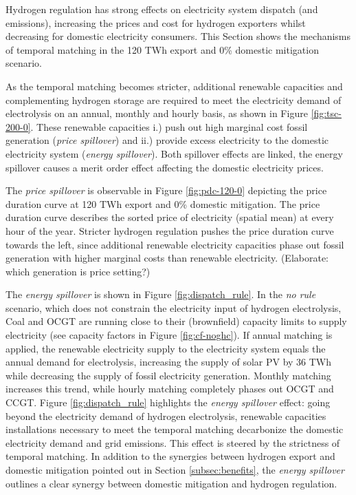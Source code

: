 Hydrogen regulation has strong effects on electricity system dispatch (and emissions), increasing the prices and cost for hydrogen exporters whilst decreasing for domestic electricity consumers. This Section shows the mechanisms of temporal matching in the 120 TWh export and 0\% domestic mitigation scenario.

As the temporal matching becomes stricter, additional renewable capacities and complementing hydrogen storage are required to meet the electricity demand of electrolysis on an annual, monthly and hourly basis, as shown in Figure \ref{fig:tsc-200-0}. These renewable capacities i.) push out high marginal cost fossil generation (\textit{price spillover}) and ii.) provide excess electricity to the domestic electricity system (\textit{energy spillover}). Both spillover effects are linked, the energy spillover causes a merit order effect affecting the domestic electricity prices.

The \textit{price spillover} is observable in Figure \ref{fig:pdc-120-0} depicting the price duration curve at 120 TWh export and 0\% domestic mitigation. The price duration curve describes the sorted price of electricity (spatial mean) at every hour of the year.
Stricter hydrogen regulation pushes the price duration curve towards the left, since additional renewable electricity capacities phase out fossil generation with higher marginal costs than renewable electricity. (Elaborate: which generation is price setting?)


The \textit{energy spillover} is shown in Figure \ref{fig:dispatch_rule}. In the \textit{no rule} scenario, which does not constrain the electricity input of hydrogen electrolysis, Coal and OCGT are running close to their (brownfield) capacity limits to supply electricity (see capacity factors in Figure \ref{fig:cf-noghc}). If annual matching is applied, the renewable electricity supply to the electricity system equals the annual demand for electrolysis, increasing the supply of solar PV by 36 TWh while decreasing the supply of fossil electricity generation. 
Monthly matching increases this trend, while hourly matching completely phases out OCGT and CCGT. Figure \ref{fig:dispatch_rule} highlights the \textit{energy spillover} effect: going beyond the electricity demand of hydrogen electrolysis, renewable capacities installations necessary to meet the temporal matching decarbonize the domestic electricity demand and grid emissions. This effect is steered by the strictness of temporal matching.
In addition to the synergies between hydrogen export and domestic mitigation pointed out in Section \ref{subsec:benefits}, the \textit{energy spillover} outlines a clear synergy between domestic mitigation and hydrogen regulation.



